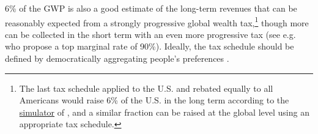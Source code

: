 \documentclass[12pt,english]{article}
\begin{document}
6\% of the GWP is also a good estimate of the long-term revenues that can be reasonably expected from a strongly progressive global wealth tax,\footnote{The last tax schedule applied to the U.S. and rebated equally to all Americans would raise 6\% of the U.S. in the long term according to the \href{https://thomasblanchet.github.io/wealth-tax/}{simulator} of \citet{blanchet_uncovering_2022}, and a similar fraction can be raised at the global level using an appropriate tax schedule.} though more can be collected in the short term with an even more progressive tax (see e.g. \citealp{chancel_world_2022} who propose a top marginal rate of 90\%). 
Ideally, the tax schedule should be defined by democratically aggregating people's preferences \citep{fabre_french_2022}. 
\end{document}
